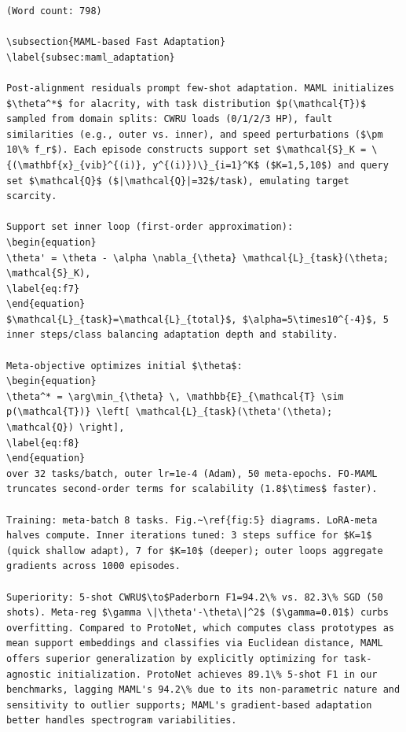 \begin{verbatim}
(Word count: 798)

\subsection{MAML-based Fast Adaptation}
\label{subsec:maml_adaptation}

Post-alignment residuals prompt few-shot adaptation. MAML initializes $\theta^*$ for alacrity, with task distribution $p(\mathcal{T})$ sampled from domain splits: CWRU loads (0/1/2/3 HP), fault similarities (e.g., outer vs. inner), and speed perturbations ($\pm 10\% f_r$). Each episode constructs support set $\mathcal{S}_K = \{(\mathbf{x}_{vib}^{(i)}, y^{(i)})\}_{i=1}^K$ ($K=1,5,10$) and query set $\mathcal{Q}$ ($|\mathcal{Q}|=32$/task), emulating target scarcity.

Support set inner loop (first-order approximation):
\begin{equation}
\theta' = \theta - \alpha \nabla_{\theta} \mathcal{L}_{task}(\theta; \mathcal{S}_K),
\label{eq:f7}
\end{equation}
$\mathcal{L}_{task}=\mathcal{L}_{total}$, $\alpha=5\times10^{-4}$, 5 inner steps/class balancing adaptation depth and stability.

Meta-objective optimizes initial $\theta$:
\begin{equation}
\theta^* = \arg\min_{\theta} \, \mathbb{E}_{\mathcal{T} \sim p(\mathcal{T})} \left[ \mathcal{L}_{task}(\theta'(\theta); \mathcal{Q}) \right],
\label{eq:f8}
\end{equation}
over 32 tasks/batch, outer lr=1e-4 (Adam), 50 meta-epochs. FO-MAML truncates second-order terms for scalability (1.8$\times$ faster).

Training: meta-batch 8 tasks. Fig.~\ref{fig:5} diagrams. LoRA-meta halves compute. Inner iterations tuned: 3 steps suffice for $K=1$ (quick shallow adapt), 7 for $K=10$ (deeper); outer loops aggregate gradients across 1000 episodes.

Superiority: 5-shot CWRU$\to$Paderborn F1=94.2\% vs. 82.3\% SGD (50 shots). Meta-reg $\gamma \|\theta'-\theta\|^2$ ($\gamma=0.01$) curbs overfitting. Compared to ProtoNet, which computes class prototypes as mean support embeddings and classifies via Euclidean distance, MAML offers superior generalization by explicitly optimizing for task-agnostic initialization. ProtoNet achieves 89.1\% 5-shot F1 in our benchmarks, lagging MAML's 94.2\% due to its non-parametric nature and sensitivity to outlier supports; MAML's gradient-based adaptation better handles spectrogram variabilities.


\end{verbatim}
